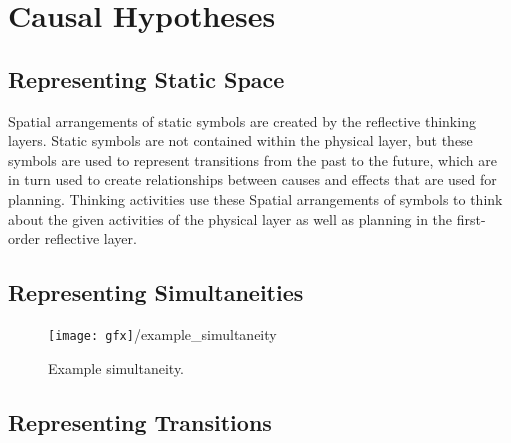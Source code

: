 \chapter{Causal Hypotheses}
\label{chapter:causal_hypotheses}

\section{Representing Static Space}

Spatial arrangements of static symbols are created by the reflective
thinking layers.  Static symbols are not contained within the physical
layer, but these symbols are used to represent transitions from the
past to the future, which are in turn used to create relationships
between causes and effects that are used for planning.  Thinking
activities use these Spatial arrangements of symbols to think about
the given activities of the physical layer as well as planning in the
first-order reflective layer.

\section{Representing Simultaneities}

\begin{figure}
\center
\texttt{[image: gfx]}/example_simultaneity
\caption{Example simultaneity.}
\label{figure:example_simultaneity}
\end{figure}

\section{Representing Transitions}


